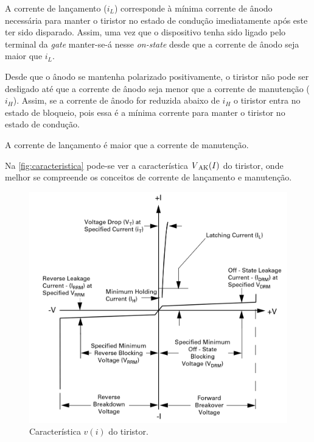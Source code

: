 \documentclass[a4paper,11pt]{article}
\numberwithin{equation}{section}
\begin{document}
A corrente de lançamento ($i_L$) corresponde à mínima corrente de ânodo necessária para manter o tiristor no estado de condução imediatamente após este ter sido disparado. Assim, uma vez que o dispositivo tenha sido ligado pelo terminal da \textit{gate} manter-se-á nesse \textit{on-state} desde que a corrente de ânodo seja maior que $i_L$.

Desde que o ânodo se mantenha polarizado positivamente, o tiristor não pode ser desligado até que a corrente de ânodo seja menor que a corrente de manutenção ($i_H$). Assim, se a corrente de ânodo for reduzida abaixo de $i_H$ o tiristor entra no estado de bloqueio, pois essa é a mínima corrente para manter o tiristor no estado de condução.

A corrente de lançamento é maior que a corrente de manutenção.

Na \autoref{fig:caracteristica} pode-se ver a característica $V\textsubscript{AK}(I)$ do tiristor, onde melhor se compreende os conceitos de corrente de lançamento e manutenção.

\pagebreak

\begin{figure}[h]
	\centering
	\includegraphics[keepaspectratio=true, scale=0.33]{teoricas/caracteristica}
	\caption{Característica $v(i)$ do tiristor.}
	\label{fig:caracteristica}
	\vspace{-0.8em}
\end{figure}
\end{document}
